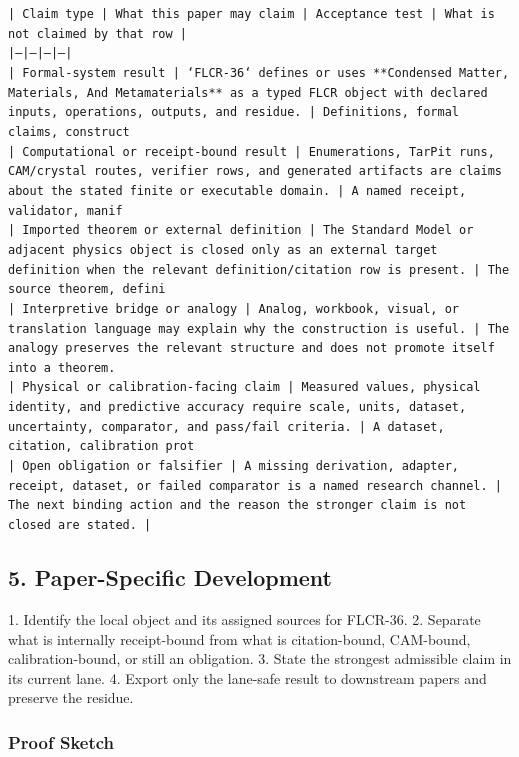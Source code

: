 \documentclass[11pt]{article}
\begin{document}
\noindent\texttt{| Claim type | What this paper may claim | Acceptance test | What is not claimed by that row |}\\
\noindent\texttt{|---|---|---|---|}\\
\noindent\texttt{| Formal-system result | `FLCR-36` defines or uses **Condensed Matter, Materials, And Metamaterials** as a typed FLCR object with declared inputs, operations, outputs, and residue. | Definitions, formal claims, construct}\\
\noindent\texttt{| Computational or receipt-bound result | Enumerations, TarPit runs, CAM/crystal routes, verifier rows, and generated artifacts are claims about the stated finite or executable domain. | A named receipt, validator, manif}\\
\noindent\texttt{| Imported theorem or external definition | The Standard Model or adjacent physics object is closed only as an external target definition when the relevant definition/citation row is present. | The source theorem, defini}\\
\noindent\texttt{| Interpretive bridge or analogy | Analog, workbook, visual, or translation language may explain why the construction is useful. | The analogy preserves the relevant structure and does not promote itself into a theorem. }\\
\noindent\texttt{| Physical or calibration-facing claim | Measured values, physical identity, and predictive accuracy require scale, units, dataset, uncertainty, comparator, and pass/fail criteria. | A dataset, citation, calibration prot}\\
\noindent\texttt{| Open obligation or falsifier | A missing derivation, adapter, receipt, dataset, or failed comparator is a named research channel. | The next binding action and the reason the stronger claim is not closed are stated. | }\\

\subsection*{5. Paper-Specific Development}

1. Identify the local object and its assigned sources for FLCR-36.
2. Separate what is internally receipt-bound from what is citation-bound, CAM-bound, calibration-bound, or still an obligation.
3. State the strongest admissible claim in its current lane.
4. Export only the lane-safe result to downstream papers and preserve the residue.

\subsubsection*{Proof Sketch}
\end{document}
